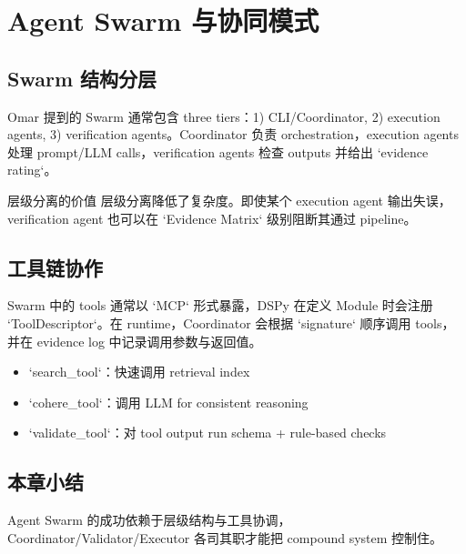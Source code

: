 \section{Agent Swarm 与协同模式}

\subsection{Swarm 结构分层}

Omar 提到的 Swarm 通常包含 three tiers：1) CLI/Coordinator, 2) execution agents, 3) verification agents。Coordinator 负责 orchestration，execution agents 处理 prompt/LLM calls，verification agents 检查 outputs 并给出 `evidence rating`。

\begin{importantbox}{层级分离的价值}
层级分离降低了复杂度。即使某个 execution agent 输出失误，verification agent 也可以在 `Evidence Matrix` 级别阻断其通过 pipeline。
\end{importantbox}

\subsection{工具链协作}

Swarm 中的 tools 通常以 `MCP` 形式暴露，DSPy 在定义 Module 时会注册 `ToolDescriptor`。在 runtime，Coordinator 会根据 `signature` 顺序调用 tools，并在 evidence log 中记录调用参数与返回值。

\begin{itemize}
    \item `search\_tool`：快速调用 retrieval index
    \item `cohere\_tool`：调用 LLM for consistent reasoning
    \item `validate\_tool`：对 tool output run schema + rule-based checks
\end{itemize}

\subsection{本章小结}

Agent Swarm 的成功依赖于层级结构与工具协调，Coordinator/Validator/Executor 各司其职才能把 compound system 控制住。

